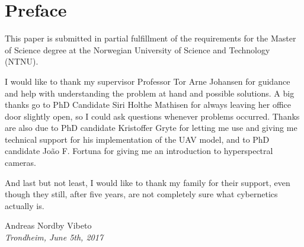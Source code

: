 \chapter*{Preface}


This paper is submitted in partial fulfillment of the requirements for the Master of Science degree at the Norwegian University of Science and Technology (NTNU).

I would like to thank my supervisor Professor Tor Arne Johansen for guidance and help with understanding the problem at hand and possible solutions. A big thanks go to PhD Candidate Siri Holthe Mathisen for always leaving her office door slightly open, so I could ask questions whenever problems occurred. Thanks are also due to PhD candidate Kristoffer Gryte for letting me use and giving me technical support for his implementation of the UAV model, and to PhD candidate João F. Fortuna for giving me an introduction to hyperspectral cameras.

And last but not least, I would like to thank my family for their support, even though they still, after five years, are not completely sure what cybernetics actually is.

\vspace{2cm}

\begin{center}
    Andreas Nordby Vibeto \\
    \emph{Trondheim, June 5th, 2017}
\end{center}